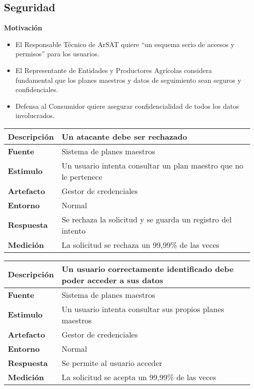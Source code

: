\subsection{Seguridad}
\textbf{Motivación}
\begin{itemize}
 \item El Responsable T\'ecnico de ArSAT quiere ``un esquema serio de accesos y permisos'' para los usuarios.
 \item El Representante de Entidades y Productores Agr\'icolas considera fundamental que los planes maestros y datos de seguimiento sean seguros y confidenciales.
 \item Defensa al Consumidor quiere asegurar confidencialidad de todos los datos involucrados.
\end{itemize}

\begin{tabular}{| l || p{12cm} |}
\hline 
\textbf{Descripci\'on} & Un atacante debe ser rechazado \\
\hline 
\textbf{Fuente} & Sistema de planes maestros \\
\hline 
\textbf{Estimulo} & Un usuario intenta consultar un plan maestro que no le pertenece \\
\hline 
\textbf{Artefacto} & Gestor de credenciales \\
\hline 
\textbf{Entorno} & Normal \\
\hline 
\textbf{Respuesta} & Se rechaza la solicitud y se guarda un registro del intento \\
\hline 
\textbf{Medici\'on} & La solicitud se rechaza un 99,99\% de las veces \\
\hline 
\end{tabular}

\medskip

\begin{tabular}{| l || p{12cm} |}
\hline 
\textbf{Descripci\'on} & Un usuario correctamente identificado debe poder acceder a sus datos \\
\hline 
\textbf{Fuente} & Sistema de planes maestros \\
\hline 
\textbf{Estimulo} & Un usuario intenta consultar sus propios planes maestros \\
\hline 
\textbf{Artefacto} & Gestor de credenciales \\
\hline 
\textbf{Entorno} & Normal \\
\hline 
\textbf{Respuesta} & Se permite al usuario acceder \\
\hline 
\textbf{Medici\'on} & La solicitud se acepta un 99,99\% de las veces \\
\hline 
\end{tabular}

